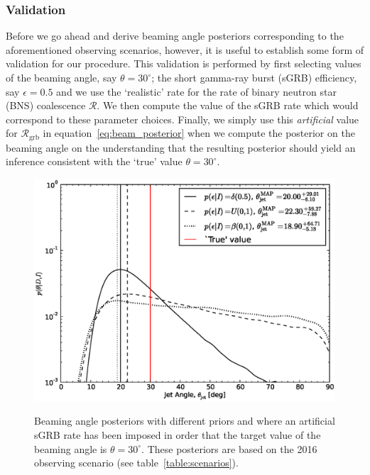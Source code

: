 \documentclass[twocolumn,nofootinbib]{revtex4-1}
\newcommand{\grbrate}{{{\mathcal R}_{\mathrm{grb}}}}
\newcommand{\cbcrate}{{{\mathcal R}}}
\def\bns#1{binary neutron star#1 (BNS#1)\gdef\bns{BNS}}
\def\sgrb#1{short gamma-ray burst#1 (sGRB#1)\gdef\sgrb{sGRB}}
\begin{document}
\subsubsection{Validation}
Before we go ahead and derive beaming angle posteriors corresponding to the
aforementioned observing scenarios, however, it is useful to establish some form
of validation for our procedure.  This validation is performed by first
selecting values of the beaming angle, say $\theta=30^{\circ}$; the \sgrb{}
efficiency, say $\epsilon=0.5$ and we use the `realistic' rate for the rate of
\bns{} coalescence $\cbcrate$.  We then compute the value of the \sgrb{} rate
which would correspond to these parameter choices.  Finally, we simply use this
\emph{artificial} value for $\grbrate$ in equation~\ref{eq:beam_posterior} when
we compute the posterior on the beaming angle on the understanding that the
resulting posterior should yield an inference consistent with the `true' value
$\theta=30^{\circ}$.
%
\begin{figure}%
\centering
{\includegraphics[width=\linewidth]{jet_angle_posterior_aligo_2016.eps}}
\caption{Beaming angle posteriors with different priors and where an artificial \sgrb{}
    rate has been imposed in order that the target value of the beaming angle is
$\theta = 30^{\circ}$.  These posteriors are based on the 2016 observing
scenario (see table~\ref{table:scenarios}). \label{fig:injjetposterio2016}}
\end{figure}
%
\end{document}

